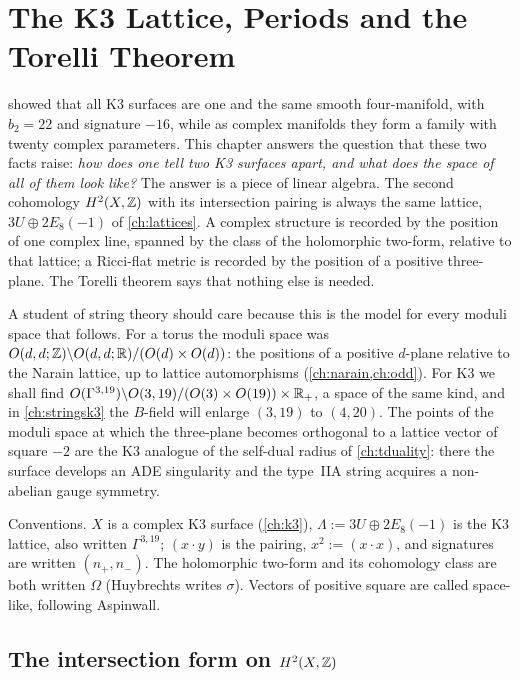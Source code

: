 \chapter{The K3 Lattice, Periods and the Torelli Theorem}\label{ch:k3lattice}

 showed that all K3 surfaces are one and the same smooth four-manifold, with
$b_2=22$ and signature $-16$, while as complex manifolds they form a family with twenty
complex parameters. This chapter answers the question that these two facts raise:
\emph{how does one tell two K3 surfaces apart, and what does the space of all of them look
like?} The answer is a piece of linear algebra. The second cohomology $H^2(X,\mathbb{Z})$ with its
intersection pairing is always the same lattice, $3U\oplus2E_8(-1)$ of \cref{ch:lattices}. A
complex structure is recorded by the position of one complex line, spanned by the class of
the holomorphic two-form, relative to that lattice; a Ricci-flat metric is recorded by the
position of a positive three-plane. The Torelli theorem says that nothing else is needed.

A student of string theory should care because this is the model for every moduli space that
follows. For a torus the moduli space was
$O(d,d;\mathbb{Z})\backslash O(d,d;\mathbb{R})/(O(d)\times O(d))$: the positions of a positive $d$-plane relative
to the Narain lattice, up to lattice automorphisms (\cref{ch:narain,ch:odd}). For K3 we shall
find $O(\Gamma^{3,19})\backslash O(3,19)/(O(3)\times O(19))\times\mathbb{R}_+$, a space of the same
kind, and in \cref{ch:stringsk3} the $B$-field will enlarge $(3,19)$ to $(4,20)$. The points
of the moduli space at which the three-plane becomes orthogonal to a lattice vector of square
$-2$ are the K3 analogue of the self-dual radius of \cref{ch:tduality}: there the surface
develops an ADE singularity and the type~IIA string acquires a non-abelian gauge symmetry.

Conventions. $X$ is a complex K3 surface (\cref{ch:k3}), $\Lambda:=3U\oplus2E_8(-1)$ is the K3
lattice, also written $\Gamma^{3,19}$; $(x\cdot y)$ is the pairing, $x^2:=(x\cdot x)$, and
signatures are written $(n_+,n_-)$. The holomorphic two-form and its cohomology class are
both written $\Omega$ (Huybrechts writes $\sigma$). Vectors of positive square are called
space-like, following Aspinwall.

\section{The intersection form on \texorpdfstring{$H^2(X,\mathbb{Z})$}{H2(X,Z)}}
\label{sec:k3lattice:form}


